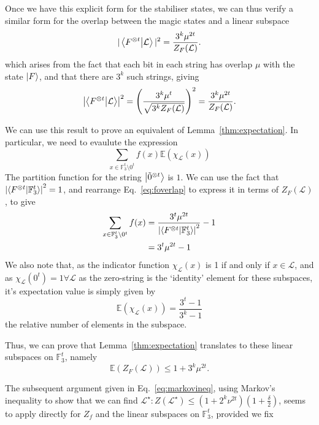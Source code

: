 \documentclass{standalone}
\begin{document}
Once we have this explicit form for the stabiliser states, we can thus verify a similar form for the overlap between the magic states and a linear subspace
\begin{equation}\label{eq:foverlap}
\vert\braket{F^{\otimes t}}{\mathcal{L}}\vert^{2}=\frac{3^{k}\mu^{2t}}{Z_{F}(\mathcal{L})}.
\end{equation}
which arises from the fact that each bit in each string has overlap $\mu$ with the state $\ket{F}$, and that there are $3^{k}$ such strings, giving 
\[\left|\braket{F^{\otimes t}}{\mathcal{L}}\right|^{2}=\left(\frac{3^{k}\mu^{t}}{\sqrt{3^{k}Z_{F}(\mathcal{L})}}\right)^{2}=\frac{3^{k}\mu^{2t}}{Z_{F}(\mathcal{L})}.\]
\par
We can use this result to prove an equivalent of Lemma~\ref{thm:expectation}. In particular, we need to evaulute the expression
\[\sum_{x\in\mathbb{F}_{3}^{t}\setminus 0^{t}}f(x)\mathbb{E}(\chi_{\mathcal{L}}(x))\] 
The partition function for the string $\ket{\tilde{0}^{\otimes t}}$ is $1$. We can use the fact that $\left|\braket{F^{\otimes t}}{\mathbb{F}_{3}^{t}}\right|^{2}=1$, and rearrange Eq.~\ref{eq:foverlap} to express it in terms of $Z_{F}(\mathcal{L})$, to give
\begin{align}
\begin{split}
\sum_{x\in\mathbb{F}_{3}^{t}\setminus 0^{t}}f(x) &= 
\frac{3^{t}\mu^{2t}}{\left|\braket{F^{\otimes t}}{\mathbb{F}_{3}^{t}}\right|^{2}} - 1\\
&= 3^{t}\mu^{2t}-1
\end{split}
\end{align}
We also note that, as the indicator function $\chi_{\mathcal{L}}(x)$ is 1 if and only if $x\in\mathcal{L}$, and as $\chi_{\mathcal{L}}(0^{t})=1\forall\mathcal{L}$ as the zero-string is the `identity' element for these subspaces, it's expectation value is simply given by
\begin{equation}
\mathbb{E}\left(\chi_{\mathcal{L}}(x)\right)=\frac{3^{t}-1}{3^{k}-1}
\end{equation}
the relative number of elements in the subspace. 
\par
Thus, we can prove that Lemma~\ref{thm:expectation} translates to these linear subspaces on $\mathbb{F}_{3}^{t}$, namely
\begin{equation}
\mathbb{E}\left( Z_{F}(\mathcal{L}) \right)\leq 1+3^{k}\mu^{2t}.
\end{equation}
\par
The subsequent argument given in Eq.~\ref{eq:markovineq}, using Markov's inequality to show that we can find $\mathcal{L}^{\star}:Z\left(\mathcal{L}^{\star}\right)\leq(1+2^{k}\nu^{2t})\left(1+\frac{\delta}{2}\right)$, seems to apply directly for $Z_{f}$ and the linear subspaces on $\mathbb{F}_{3}^{t}$, provided we fix
\end{document}
